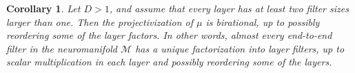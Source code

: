 \documentclass[twoside]{article}
\newtheorem{corollary}[theorem]{Corollary}
\theoremstyle{definition}
\theoremstyle{remark}
\begin{document}
\begin{corollary} \label{cor:birationalHighDimensions}
    Let $D >1$, and assume that every layer
    has at least two filter sizes larger than one. 
    Then the projectivization of $\mu$ is birational, up to possibly reordering some of the layer factors.
    In other words, almost every end-to-end filter in the neuromanifold $\mathcal{M}$ has a unique factorization into layer filters, up to scalar multiplication in each layer and possibly reordering some of the layers. 
\end{corollary}
\end{document}
